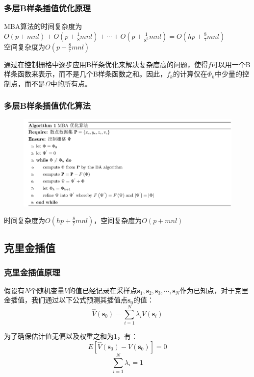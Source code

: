 \documentclass{beamer}
\begin{document}
\begin{frame}
    \frametitle{多层B样条插值优化原理}
    MBA算法的时间复杂度为$ O\left( p+mnl \right) + O\left( p+\frac{1}{8}mnl \right)+ \cdots+O\left( p+\frac{1}{8^{h}}mnl \right) = O\left( hp+\frac{8}{7}mnl \right) $ \\
    空间复杂度为$ O\left( p+\frac{8}{7}mnl \right) $

    \vspace*{1cm}
    通过在控制栅格中逐步应用B样条优化来解决复杂度高的问题，使得$ f $可以用一个B样条函数来表示，而不是几个B样条函数之和。因此，$ f_{k} $的计算仅在$ \Phi_{k} $中少量的控制点，而不是$ \Omega $中的所有点。
\end{frame}

\begin{frame}
    \frametitle{多层B样条插值优化算法}
    \begin{figure}
        \centering
        \includegraphics[height=0.7\textheight]{figures/MBA优化算法.jpg}
    \end{figure}

    时间复杂度为$ O\left( hp+\frac{8}{7}mnl \right) $，空间复杂度为$ O\left( p+mnl \right) $
\end{frame}

\subsection{克里金插值}
\begin{frame}
    \frametitle{克里金插值原理}
    假设有$ N $个随机变量$ V $的值已经记录在采样点$ \mathbf{s}_{1}, \mathbf{s}_{2}, \mathbf{s}_{3} , \cdots , \mathbf{s}_{N} $作为已知点，对于克里金插值，我们通过以下公式预测其插值点$ \mathbf{s}_{0} $的值：
    \begin{equation}
        \hat{V}\left( \mathbf{s}_{0} \right) = \sum_{i=1}^{N} \lambda_{i} V\left( \mathbf{s}_{i} \right)
        \label{点克里金插值公式}
    \end{equation}

    为了确保估计值无偏以及权重之和为1，有：
    \begin{equation}
        E\left[ \hat{V}\left( \mathbf{s}_{0} \right) - V\left( \mathbf{s}_{0} \right) \right] = 0
        \label{点克里金插值无偏}
    \end{equation}
    \begin{equation}
        \sum_{i=1}^{N} \lambda_{i} = 1
        \label{点克里金插值权重之和为1}
    \end{equation}
\end{frame}
\end{document}
